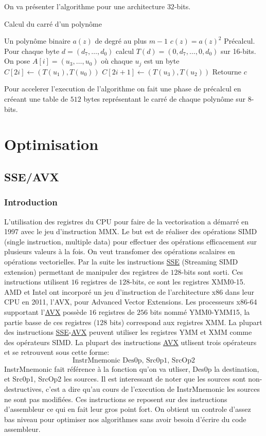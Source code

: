 \documentclass[12pt]{article}
\begin{document}
On va présenter l'algorithme pour une architecture $32$-bits.

\begin{algorithm}
\caption{Calcul du carré d'un polynôme}
\begin{algorithmic}
\REQUIRE Un polynôme binaire $a(z)$ de degré au plus $m-1$
\ENSURE $c(z) = a(z)^2$
\STATE Précalcul. Pour chaque byte $d=(d_7,\ldots, d_0)$ calcul $T(d) = (0,d_7,\ldots,0,d_0)$ sur 16-bits.
\STATE On pose $A[i] = (u_3, \ldots, u_0)$ où chaque $u_j$ est un byte
\STATE $C[2i] \leftarrow (T(u_1), T(u_0))$
\STATE $C[2i+1] \leftarrow (T(u_3), T(u_2))$
\ENDFOR
\STATE Retourne $c$
\end{algorithmic}
\end{algorithm}

Pour accelerer l'execution de l'algorithme on fait une phase de précalcul en créeant une table de $512$ bytes représentant le carré de chaque polynôme sur $8$-bits.

\section{Optimisation}

\subsection{SSE/AVX}

\subsubsection{Introduction}

L'utilisation des registres du CPU pour faire de la vectorisation a démarré en 1997 avec le jeu d'instruction MMX. Le but est de réaliser des opérations SIMD (single instruction, multiple data) pour effectuer des opérations efficacement sur plusieurs valeurs à la fois. On veut transfomer des opérations scalaires en opérations vectorielles. Par la suite les instructions \url{SSE} (Streaming SIMD extension) permettant de manipuler des registres de $128$-bits sont sorti. Ces instructions utilisent $16$ registres de $128$-bits, ce sont les registres XMM0-15. AMD et Intel ont incorporé un jeu d'instruction de l'architecture x86 dans leur CPU en 2011, l'AVX, pour Advanced Vector Extensions.
Les processeurs x86-64 supportant l'\url{AVX} possède $16$ registres de $256$ bits nommé YMM0-YMM15, la partie basse de ces registres ($128$ bits) correspond aux registres XMM. La plupart des instructions \url{SSE}-\url{AVX} peuvent utiliser les registres YMM et XMM comme des opérateurs SIMD. La plupart des instructions \url{AVX} utlisent trois opérateurs et se retrouvent sous cette forme:
$$ \text{InstrMnemonic Des0p, Src0p1, SrcOp2} $$
InstrMnemonic fait référence à la fonction qu'on va utliser, Des0p la destination, et Src0p1, SrcOp2 les sources. Il est interessant de noter que les sources sont non-destructives, c'est a dire qu'au cours de l'execution de InstrMnemonic les sources ne sont pas modifiées. Ces instructions se reposent sur des instructions d'assembleur ce qui en fait leur gros point fort. On obtient un controle d'assez bas niveau pour optimiser nos algorithmes sans avoir besoin d'écrire du code assembleur.
\end{document}
